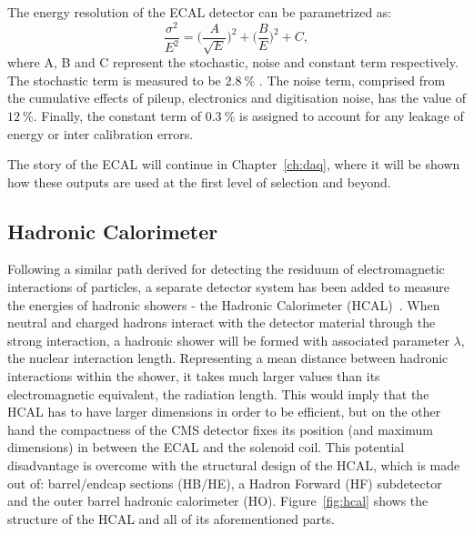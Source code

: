 \hspace{10pt} The energy resolution of the ECAL detector can be parametrized as:
\begin{equation}
    \frac{\sigma^2}{E^2} =\bigg (\frac{A}{\sqrt{E}}\bigg )^2 +\bigg (\frac{B}{E} \bigg )^2 + C,
\end{equation}
where A, B and C represent the stochastic, noise and constant term respectively. The stochastic term is measured to be $2.8~$\% . The noise term, comprised from the cumulative effects of pileup, electronics and digitisation noise, has the value of $12~$\%. Finally, the constant term of $0.3~$\% is assigned to account for any leakage of energy or inter calibration errors. 

\hspace{10pt} The story of the ECAL will continue in Chapter~\ref{ch:daq}, where it will be shown how these outputs are used at the first level of selection and beyond.

\subsection{Hadronic Calorimeter}

\hspace{10pt} Following a similar path derived for detecting the residuum of electromagnetic interactions of particles, a separate detector system has been added to measure the energies of hadronic showers - the Hadronic Calorimeter (HCAL)~\cite{cms:paper,hcal_performance}. When neutral and charged hadrons interact with the detector material through the strong interaction, a hadronic shower will be formed with associated parameter $\lambda$, the nuclear interaction length. Representing a mean distance between hadronic interactions within the shower, it takes much larger values than its electromagnetic equivalent, the radiation length. This would imply that the HCAL has to have larger dimensions in order to be efficient, but on the other hand the compactness of the CMS detector fixes its position (and maximum dimensions) in between the ECAL and the solenoid coil. This potential disadvantage is overcome with the structural design of the HCAL, which is made out of: barrel/endcap sections (HB/HE), a Hadron Forward (HF) subdetector and the outer barrel hadronic calorimeter (HO). Figure~\ref{fig:hcal} shows the structure of the HCAL and all of its aforementioned parts.


